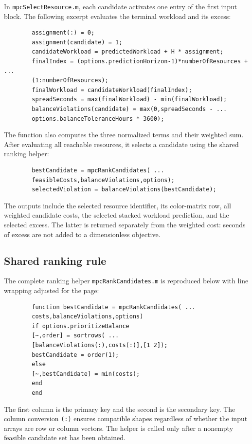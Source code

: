 In \texttt{mpcSelectResource.m}, each candidate activates one entry of the
first input block. The following excerpt evaluates the terminal workload
and its excess:
\begin{small}
	\begin{verbatim}
		assignment(:) = 0;
		assignment(candidate) = 1;
		candidateWorkload = predictedWorkload + H * assignment;
		finalIndex = (options.predictionHorizon-1)*numberOfResources + ...
		(1:numberOfResources);
		finalWorkload = candidateWorkload(finalIndex);
		spreadSeconds = max(finalWorkload) - min(finalWorkload);
		balanceViolations(candidate) = max(0,spreadSeconds - ...
		options.balanceToleranceHours * 3600);
	\end{verbatim}
\end{small}
The function also computes the three normalized terms and their weighted
sum. After evaluating all reachable resources, it selects a candidate using
the shared ranking helper:
\begin{small}
	\begin{verbatim}
		bestCandidate = mpcRankCandidates( ...
		feasibleCosts,balanceViolations,options);
		selectedViolation = balanceViolations(bestCandidate);
	\end{verbatim}
\end{small}
The outputs include the selected resource identifier, its color-matrix row,
all weighted candidate costs, the selected stacked workload prediction, and
the selected excess. The latter is returned separately from the weighted
cost: seconds of excess are not added to a dimensionless objective.

\subsection{Shared ranking rule}

The complete ranking helper \texttt{mpcRankCandidates.m} is reproduced below
with line wrapping adjusted for the page:
\begin{small}
	\begin{verbatim}
		function bestCandidate = mpcRankCandidates( ...
		costs,balanceViolations,options)
		if options.prioritizeBalance
		[~,order] = sortrows( ...
		[balanceViolations(:),costs(:)],[1 2]);
		bestCandidate = order(1);
		else
		[~,bestCandidate] = min(costs);
		end
		end
	\end{verbatim}
\end{small}
The first column is the primary key and the second is the secondary key.
The column conversion \texttt{(:)} ensures compatible shapes regardless of
whether the input arrays are row or column vectors. The helper is called
only after a nonempty feasible candidate set has been obtained.

